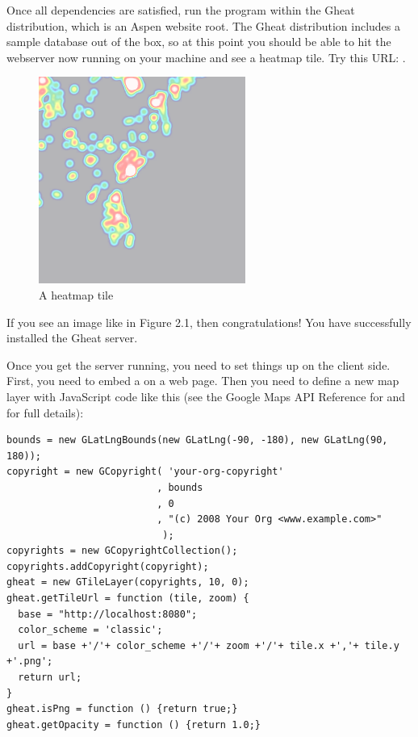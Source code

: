 \documentclass{manual}
\begin{document}
Once all dependencies are satisfied, run the  program within the
Gheat distribution, which is an Aspen website root. The Gheat distribution
includes a sample database out of the box, so at this point you should be able
to hit the webserver now running on your machine and see a heatmap tile. Try
this URL:
.

\begin{figure}[htp]
\includegraphics[bb=0 0 256 256]{img/4,6.png}
\caption{A heatmap tile}\label{fig:tile}
\end{figure}

If you see an image like in Figure 2.1, then congratulations! You have
successfully installed the Gheat server.

Once you get the server running, you need to set things up on the client side.
First, you need to embed a  on a web page. Then you need to define
a new map layer with JavaScript code like this (see the Google Maps API
Reference for
and
for full details):

\begin{verbatim}
bounds = new GLatLngBounds(new GLatLng(-90, -180), new GLatLng(90, 180));
copyright = new GCopyright( 'your-org-copyright'
                          , bounds
                          , 0
                          , "(c) 2008 Your Org <www.example.com>"
                           );
copyrights = new GCopyrightCollection();
copyrights.addCopyright(copyright);
gheat = new GTileLayer(copyrights, 10, 0);
gheat.getTileUrl = function (tile, zoom) {
  base = "http://localhost:8080";
  color_scheme = 'classic';
  url = base +'/'+ color_scheme +'/'+ zoom +'/'+ tile.x +','+ tile.y +'.png';
  return url;
}
gheat.isPng = function () {return true;}
gheat.getOpacity = function () {return 1.0;}
\end{verbatim}
\end{document}
